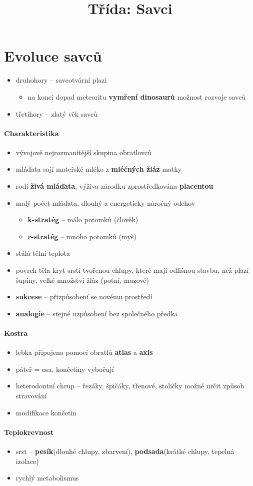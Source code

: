\title{Třída: Savci}


\section{Evoluce savců}
\begin{itemize}
\item druhohory -- savcotvární plazi
	\begin{itemize}
	\item na konci dopad meteoritu \ra \textbf{vymření dinosaurů} \ra možnost rozvoje savců
	\end{itemize}
\item třetihory -- zlatý věk savců
\end{itemize}

\paragraph{Charakteristika}
\begin{itemize}
\item vývojově nejrozmanitější skupina obratlovců
\item mláďata sají mateřské mléko z \textbf{mléčných žláz} matky
\item rodí \textbf{živá mláďata}, výživa zárodku zprostředkována \textbf{placentou}
\item malý počet mláďata, dlouhý a energeticky náročný odchov
	\begin{itemize}
	\item \textbf{k-stratég} -- málo potomků (člověk)
	\item \textbf{r-stratég} -- mnoho potomků (myš)
	\end{itemize}
\item stálá tělní teplota
\item povrch těla kryt srstí tvořenou chlupy, které mají odlišnou stavbu, než plazí šupiny, velké množství žláz (potní, mazové)
\item \textbf{sukcese} -- přizpůsobení se novému prostředí
\item \textbf{analogie} -- stejné uzpůsobení bez společného předka
\end{itemize}


\paragraph{Kostra}
\begin{itemize}
\item lebka připojena pomocí obratlů \textbf{atlas} a \textbf{axis}
\item páteř = osa, končetiny vybočují
\item heterodontní chrup -- řezáky, špičáky, třenové, stoličky \ra možné určit způsob stravování
\item modifikace končetin
\end{itemize}


\paragraph{Teplokrevnost}
\begin{itemize}
\item srst -- \textbf{pesík}(dlouhé chlupy, zbarvení), \textbf{podsada}(krátké chlupy, tepelná izolace)
\item rychlý metabolismus
\end{itemize}

